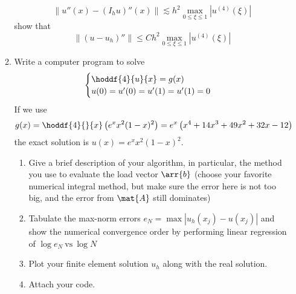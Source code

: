 \documentclass{article}
\begin{document}
\begin{enumerate}
\begin{enumerate}
				\begin{equation*}
					\left\|u''(x) - \left(I_h u\right)''(x)\right\| \lesssim
						h^2\max_{0\leq\xi\leq 1}\left|u^{(4)}(\xi)\right|
				\end{equation*}
				show that
				\begin{equation*}
					\left\|\left(u - u_h\right)''\right\| \leq
						Ch^2\max_{0\leq\xi\leq 1}\left|u^{(4)}(\xi)\right|
				\end{equation*}
			\item Write a computer program to solve
				\begin{equation*}
					\begin{cases}
						\displaystyle\hoddf{4}{u}{x} = g(x) \\
						u(0) = u'(0) = u'(1) = u'(1) = 0
					\end{cases}
				\end{equation*}
				If we use
				\begin{equation*}
					g(x) = \hoddf{4}{}{x}\left(e^x x^2(1 - x)^2\right) =
						e^x\left(x^4 + 14x^3 + 49x^2 + 32x - 12\right)
				\end{equation*}
				the exact solution is $u(x) = e^x x^2(1 - x)^2$.
				\begin{enumerate}
					\item Give a brief description of your algorithm, in particular,
						the method you use to evaluate the load vector $\arr{b}$
						(choose your favorite numerical integral method,
						but make sure the error here is not too big,
						and the error from $\mat{A}$ still dominates)
					\item Tabulate the max-norm errors $e_N = \max\left|u_h(x_j) - u(x_j)\right|$
						and show the numerical convergence order by performing linear regression of
						$\log{e_N} \mathrm{\ vs\ } \log{N}$
					\item Plot your finite element solution $u_h$ along with the real solution.
					\item Attach your code.
				\end{enumerate}
		\end{enumerate}
\end{enumerate}
\end{document}
